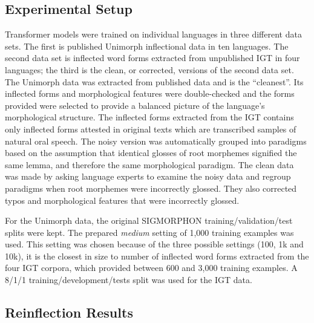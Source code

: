 \subsection{Experimental Setup}
\label{sec:inflectionsetup}

Transformer models were trained on individual languages in three different data sets. The first is published Unimorph inflectional data in ten languages. The second data set is inflected word forms extracted from unpublished IGT in four languages; the third is the clean, or corrected, versions of the second data set. 
The Unimorph data was extracted from published data and is the ``cleanest''. Its inflected forms and morphological features were double-checked and the forms provided were selected to provide a balanced picture of the language's morphological structure. The inflected forms extracted from the IGT contains only inflected forms attested in original texts which are transcribed samples of natural oral speech. The noisy version was automatically grouped into paradigms based on the assumption that identical glosses of root morphemes signified the same lemma, and therefore the same morphological paradigm. The clean data was made by asking language experts to examine the noisy data and regroup paradigms when root morphemes were incorrectly glossed. They also corrected typos and morphological features that were incorrectly glossed. 

For the Unimorph data, the original SIGMORPHON training/validation/test splits were kept. The prepared \textit{medium} setting of 1,000 training examples was used. This setting was chosen because of the three possible settings (100, 1k and 10k), it is the closest in size to number of inflected word forms extracted from the four IGT corpora, which provided between 600 and 3,000 training examples. A 8/1/1 training/development/tests split was used for the IGT data.


\subsection{Reinflection Results}
\label{sec:inflectionresults}

